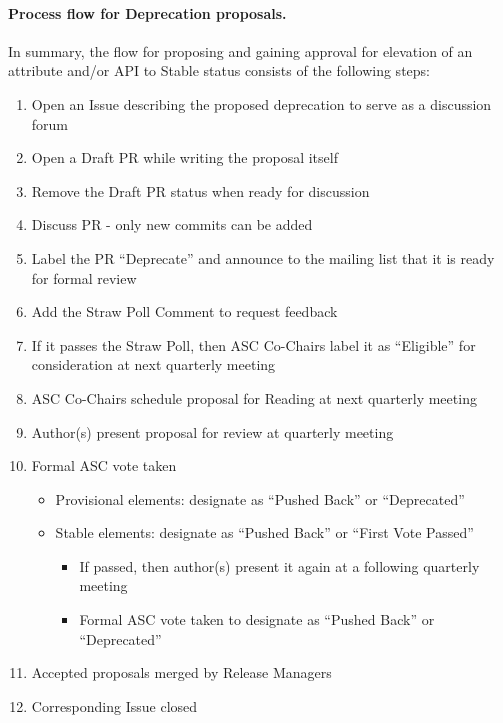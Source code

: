 \documentclass{article}
\providecommand{\tightlist}{%
  \setlength{\itemsep}{0pt}\setlength{\parskip}{0pt}}
\begin{document}
\hypertarget{process-flow-for-deprecation-proposals}{%
\paragraph{Process flow for Deprecation
proposals.}\label{process-flow-for-deprecation-proposals}}

In summary, the flow for proposing and gaining approval for elevation of
an attribute and/or API to Stable status consists of the following
steps:

\begin{enumerate}
\def\labelenumi{\arabic{enumi}.}
\tightlist
\item
  Open an Issue describing the proposed deprecation to serve as a
  discussion forum
\item
  Open a Draft PR while writing the proposal itself
\item
  Remove the Draft PR status when ready for discussion
\item
  Discuss PR - only new commits can be added
\item
  Label the PR ``Deprecate'' and announce to the mailing list that it is
  ready for formal review
\item
  Add the Straw Poll Comment to request feedback
\item
  If it passes the Straw Poll, then ASC Co-Chairs label it as
  ``Eligible'' for consideration at next quarterly meeting
\item
  ASC Co-Chairs schedule proposal for Reading at next quarterly
  meeting
\item
  Author(s) present proposal for review at quarterly meeting
\item
  Formal ASC vote taken

  \begin{itemize}
  \tightlist
  \item
    Provisional elements: designate as ``Pushed Back'' or
    ``Deprecated''
  \item
    Stable elements: designate as ``Pushed Back'' or ``First Vote
    Passed''

    \begin{itemize}
    \tightlist
    \item
      If passed, then author(s) present it again at a following
      quarterly meeting
    \item
      Formal ASC vote taken to designate as ``Pushed Back'' or
      ``Deprecated''
    \end{itemize}
  \end{itemize}
\item
  Accepted proposals merged by Release Managers
\item
  Corresponding Issue closed
\end{enumerate}
\end{document}
